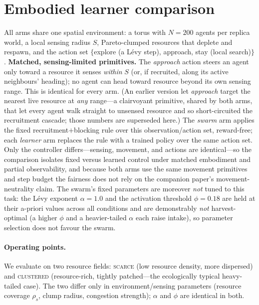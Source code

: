 \documentclass{article}
\begin{document}
\section{Embodied learner comparison}
\label{app:embodied}
All arms share one spatial environment: a torus with $N=200$ agents per replica world, a local sensing radius
$S$, Pareto-clumped resources that deplete and respawn, and the action set $\{$explore (a L\'evy step),
approach, stay (local search)$\}$. \textbf{Matched, sensing-limited primitives.} The \emph{approach} action
steers an agent only toward a resource it senses \emph{within} $S$ (or, if recruited, along its active
neighbours' heading); no agent can head toward resource beyond its own sensing range. This is identical for
every arm. (An earlier version let \emph{approach} target the nearest live resource at \emph{any} range---a
clairvoyant primitive, shared by both arms, that let every agent walk straight to unsensed resource and so
short-circuited the recruitment cascade; those numbers are superseded here.) The \emph{swarm} arm applies the
fixed recruitment$+$blocking rule over this observation/action set, reward-free; each \emph{learner} arm
replaces the rule with a trained policy over the same action set. Only the controller differs---sensing,
movement, and actions are identical---so the comparison isolates fixed versus learned control under matched
embodiment and partial observability, and because both arms use the same movement primitives and step budget
the fairness does not rely on the companion paper's movement-neutrality claim. The swarm's fixed parameters are
moreover \emph{not} tuned to this task: the L\'evy exponent $\alpha{=}1.0$ and the activation threshold
$\phi{=}0.18$ are held at their a-priori values across all conditions and are demonstrably \emph{not}
harvest-optimal (a higher $\phi$ and a heavier-tailed $\alpha$ each raise intake), so parameter selection does
not favour the swarm.

\paragraph{Operating points.} We evaluate on two resource fields: \textsc{scarce} (low resource density, more
dispersed) and \textsc{clustered} (resource-rich, tightly patched---the ecologically typical heavy-tailed case).
The two differ only in environment/sensing parameters (resource coverage $\rho_s$, clump radius, congestion
strength); $\alpha$ and $\phi$ are identical in both.
\end{document}
